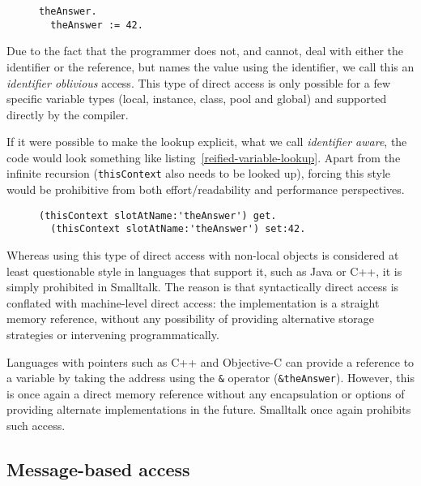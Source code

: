 \documentclass[preprint,authoryear]{acm_proc_article-sp}
\begin{document}
\begin{figure}[htbp]
\begin{lstlisting}[style=L,label=variable-lookup,caption=Interacting with a local resource.]
  theAnswer.
  theAnswer := 42.
\end{lstlisting}
\end{figure}

Due to the fact that the programmer does not, and cannot, deal with either the identifier
or the reference, but names the value using the identifier, we call this an {\em identifier oblivious}
access.  This type of direct access is only possible for a few specific variable types
(local, instance, class, pool and global) and supported directly by the compiler.

If it were possible to make the lookup explicit, what we call {\em identifier aware},
the code would look something like listing~\ref{reified-variable-lookup}.  Apart
from the infinite recursion ({\tt thisContext}  also needs to be looked up),
forcing this style would be prohibitive from both effort/readability and performance
perspectives.


\begin{figure}[htbp]
\begin{lstlisting}[style=L,label=reified-variable-lookup,caption=Reified local resource access.]
  (thisContext slotAtName:'theAnswer') get.
  (thisContext slotAtName:'theAnswer') set:42.
\end{lstlisting}
\end{figure}

Whereas using this type of direct access with non-local objects is considered at least
questionable style in languages that support it, such as Java or C++, it is simply prohibited in Smalltalk.
The reason is that syntactically direct access is conflated with machine-level direct
access:  the implementation is a straight memory reference, without any possibility
of providing alternative storage strategies or intervening programmatically.

Languages with pointers such as C++ and Objective-C can provide a reference to a variable
by taking the address using the {\tt \&} operator ({\tt \&theAnswer}).   However, this is once
again a direct memory reference without any encapsulation or options of providing 
alternate implementations in the future.  Smalltalk once again prohibits such access.

\subsection{Message-based access}
\end{document}
